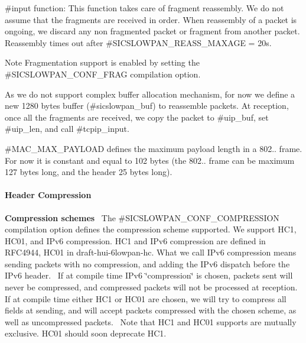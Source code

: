 \begin{DoxyItemize}
\item \#input function\+: This function takes care of fragment reassembly. We do not assume that the fragments are received in order. When reassembly of a packet is ongoing, we discard any non fragmented packet or fragment from another packet. Reassembly times out after \#\+S\+I\+C\+S\+L\+O\+W\+P\+A\+N\+\_\+\+R\+E\+A\+S\+S\+\_\+\+M\+A\+X\+A\+GE = 20s.\end{DoxyItemize}
\begin{DoxyNote}{Note}
Fragmentation support is enabled by setting the \#\+S\+I\+C\+S\+L\+O\+W\+P\+A\+N\+\_\+\+C\+O\+N\+F\+\_\+\+F\+R\+AG compilation option.

As we do not support complex buffer allocation mechanism, for now we define a new 1280 bytes buffer (\#sicslowpan\+\_\+buf) to reassemble packets. At reception, once all the fragments are received, we copy the packet to \#uip\+\_\+buf, set \#uip\+\_\+len, and call \#tcpip\+\_\+input.

\#\+M\+A\+C\+\_\+\+M\+A\+X\+\_\+\+P\+A\+Y\+L\+O\+AD defines the maximum payload length in a 802.. frame. For now it is constant and equal to 102 bytes (the 802.. frame can be maximum 127 bytes long, and the header 25 bytes long).
\end{DoxyNote}
\hypertarget{a00070_hc}{}\paragraph{Header Compression}\label{a00070_hc}
{\bfseries Compression schemes}~\newline
 The \#\+S\+I\+C\+S\+L\+O\+W\+P\+A\+N\+\_\+\+C\+O\+N\+F\+\_\+\+C\+O\+M\+P\+R\+E\+S\+S\+I\+ON compilation option defines the compression scheme supported. We support H\+C1, H\+C01, and I\+Pv6 compression. H\+C1 and I\+Pv6 compression are defined in R\+F\+C4944, H\+C01 in draft-\/hui-\/6lowpan-\/hc. What we call I\+Pv6 compression means sending packets with no compression, and adding the I\+Pv6 dispatch before the I\+Pv6 header.~\newline
 If at compile time I\+Pv6 \char`\"{}compression\char`\"{} is chosen, packets sent will never be compressed, and compressed packets will not be processed at reception.~\newline
 If at compile time either H\+C1 or H\+C01 are chosen, we will try to compress all fields at sending, and will accept packets compressed with the chosen scheme, as well as uncompressed packets.~\newline
 Note that H\+C1 and H\+C01 supports are mutually exclusive. H\+C01 should soon deprecate H\+C1.

